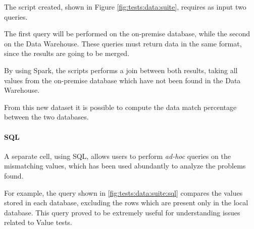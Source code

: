    The script created, shown in Figure \ref{fig:tests:data:suite}, requires as input two queries.
    
    The first query will be performed on the on-premise database, while the second on the Data Warehouse.
    These queries must return data in the same format, since the results are going to be merged.
    
    By using Spark, the scripts performs a join between both results, taking all values from the on-premise database which have not been found in the Data Warehouse.
    
    From this new dataset it is possible to compute the data match percentage between the two databases.
    
    \paragraph{SQL}
        A separate cell, using SQL, allows users to perform \textit{ad-hoc} queries on the mismatching values, which has been used abundantly to analyze the problems found.
        
        For example, the query shown in \ref{fig:tests:data:suite:sql} compares the values stored in each database, excluding the rows which are present only in the local database.
        This query proved to be extremely useful for understanding issues related to Value tests.